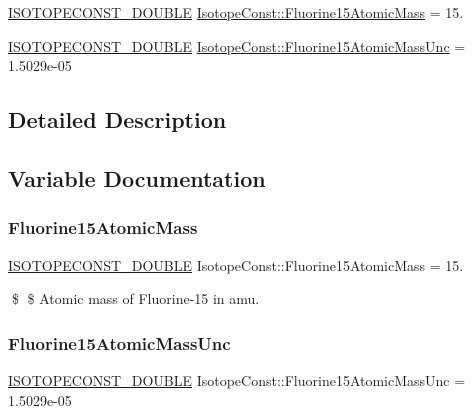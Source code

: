 \begin{DoxyCompactItemize}
\item 
\mbox{\hyperlink{group___isotope_const-_macros_ga8f45a7272ce02c0b4c65c44636ed719a}{I\+S\+O\+T\+O\+P\+E\+C\+O\+N\+S\+T\+\_\+\+D\+O\+U\+B\+LE}} \mbox{\hyperlink{group___isotope_const-_fluorine-_f15_ga39b4281415de5b69262a43c21dca9357}{Isotope\+Const\+::\+Fluorine15\+Atomic\+Mass}} = 15.
\item 
\mbox{\hyperlink{group___isotope_const-_macros_ga8f45a7272ce02c0b4c65c44636ed719a}{I\+S\+O\+T\+O\+P\+E\+C\+O\+N\+S\+T\+\_\+\+D\+O\+U\+B\+LE}} \mbox{\hyperlink{group___isotope_const-_fluorine-_f15_ga6b049a821158b434caad64cdaf59f991}{Isotope\+Const\+::\+Fluorine15\+Atomic\+Mass\+Unc}} = 1.\+5029e-\/05
\end{DoxyCompactItemize}


\subsection{Detailed Description}


\subsection{Variable Documentation}
\mbox{\label{group___isotope_const-_fluorine-_f15_ga39b4281415de5b69262a43c21dca9357}} 
\subsubsection{\texorpdfstring{Fluorine15\+Atomic\+Mass}{Fluorine15AtomicMass}}
{\footnotesize\ttfamily \mbox{\hyperlink{group___isotope_const-_macros_ga8f45a7272ce02c0b4c65c44636ed719a}{I\+S\+O\+T\+O\+P\+E\+C\+O\+N\+S\+T\+\_\+\+D\+O\+U\+B\+LE}} Isotope\+Const\+::\+Fluorine15\+Atomic\+Mass = 15.}

\$ \$ Atomic mass of Fluorine-\/15 in amu. \mbox{\label{group___isotope_const-_fluorine-_f15_ga6b049a821158b434caad64cdaf59f991}} 
\subsubsection{\texorpdfstring{Fluorine15\+Atomic\+Mass\+Unc}{Fluorine15AtomicMassUnc}}
{\footnotesize\ttfamily \mbox{\hyperlink{group___isotope_const-_macros_ga8f45a7272ce02c0b4c65c44636ed719a}{I\+S\+O\+T\+O\+P\+E\+C\+O\+N\+S\+T\+\_\+\+D\+O\+U\+B\+LE}} Isotope\+Const\+::\+Fluorine15\+Atomic\+Mass\+Unc = 1.\+5029e-\/05}

